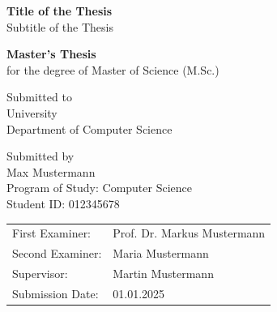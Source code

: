 \begin{titlepage}
  \thispagestyle{empty}


  \vspace{2cm}

  \begin{center}
    {\LARGE \textbf{Title of the Thesis} \\}
    \vspace{0.5cm}
    {\large Subtitle of the Thesis}

    \vspace{1.2cm}
    {\large \textbf{Master's Thesis} \\}
    \vspace{0.2cm}
    for the degree of Master of Science (M.Sc.)

    \vspace{1.2cm}
    Submitted to \\
    University \\
    Department of Computer Science

    \vspace{1.2cm}
    Submitted by \\
    Max Mustermann \\
    Program of Study: Computer Science\\
    Student ID: 012345678
  \end{center}

  \vfill

  \begingroup
  \renewcommand{\arraystretch}{1.0}
  \begin{tabular}{@{}ll@{}}
    First Examiner:  & Prof. Dr. Markus Mustermann \\
    Second Examiner: & Maria Mustermann            \\
    Supervisor:      & Martin Mustermann           \\
    Submission Date: & 01.01.2025                  \\
  \end{tabular}
  \endgroup

\end{titlepage}
\addtocounter{page}{1}
